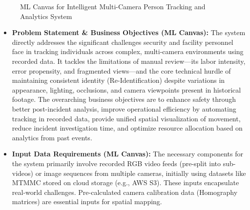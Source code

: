 \begin{figure}[!htb]
    \centering
    \caption{ML Canvas for Intelligent Multi-Camera Person Tracking and Analytics System}
    \label{fig:ml_canvas}
\end{figure}
\clearpage
\begin{itemize}
    \item \textbf{Problem Statement \& Business Objectives (ML Canvas):}
        The system directly addresses the significant challenges security and facility personnel face in tracking individuals across complex, multi-camera environments using recorded data. It tackles the limitations of manual review—its labor intensity, error propensity, and fragmented views—and the core technical hurdle of maintaining consistent identity (Re-Identification) despite variations in appearance, lighting, occlusions, and camera viewpoints present in historical footage. The overarching business objectives are to enhance safety through better post-incident analysis, improve operational efficiency by automating tracking in recorded data, provide unified spatial visualization of movement, reduce incident investigation time, and optimize resource allocation based on analytics from past events.

    \item \textbf{Input Data Requirements (ML Canvas):}
        The necessary components for the system primarily involve recorded RGB video feeds (pre-split into sub-videos) or image sequences from multiple cameras, initially using datasets like MTMMC stored on cloud storage (e.g., AWS S3). These inputs encapsulate real-world challenges. Pre-calculated camera calibration data (Homography matrices) are essential inputs for spatial mapping.


\end{itemize}
